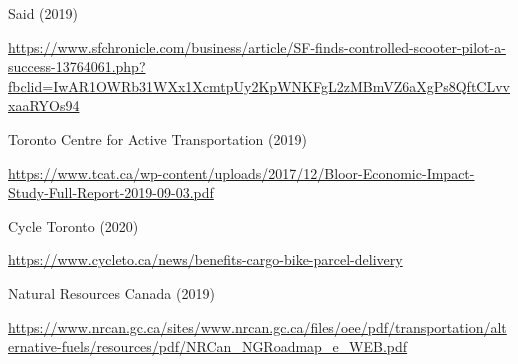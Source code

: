 \documentclass[letter]{ourGreenwayBrand}
\begin{document}
\hspace{1em}Said (2019)

\hspace{1em}\url{https://www.sfchronicle.com/business/article/SF-finds-controlled-scooter-pilot-a-success-13764061.php?fbclid=IwAR1OWRb31WXx1XcmtpUy2KpWNKFgL2zMBmVZ6aXgPs8QftCLvvxaaRYOs94}

\hspace{1em}Toronto Centre for Active Transportation (2019)

\hspace{1em}\url{https://www.tcat.ca/wp-content/uploads/2017/12/Bloor-Economic-Impact-Study-Full-Report-2019-09-03.pdf}

\hspace{1em}Cycle Toronto (2020)

\hspace{1em} \url{https://www.cycleto.ca/news/benefits-cargo-bike-parcel-delivery}

\hspace{1em}Natural Resources Canada (2019)

\hspace{1em}\url{https://www.nrcan.gc.ca/sites/www.nrcan.gc.ca/files/oee/pdf/transportation/alternative-fuels/resources/pdf/NRCan_NGRoadmap_e_WEB.pdf}

\vspace{2em}
\end{document}
